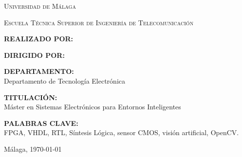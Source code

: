 \cleardoublepage

\begin{titlepage}
    \begin{center}
        {\large\scshape Universidad de Málaga \par}
        \vspace{0.2cm}
        {\normalsize\scshape Escuela Técnica Superior de Ingeniería de Telecomunicación \par}        
        \vspace{1.5cm}
        
        {\Large\bfseries \myTitle \par}
        
        \vspace{1.5cm}
    \end{center}
    
    \noindent\textbf{REALIZADO POR:}\\
    \myName
    
    \vspace{0.8cm}
    
    \noindent\textbf{DIRIGIDO POR:}\\
    \mySupervisor
    
    \vspace{0.8cm}
    
    \noindent\textbf{DEPARTAMENTO:}\\
    Departamento de Tecnolog{\'i}a Electr{\'o}nica
    
    \vspace{0.8cm}
    
    \noindent\textbf{TITULACI{\'O}N:}\\
    M{\'a}ster en Sistemas Electr{\'o}nicos para Entornos Inteligentes
    
    \vspace{0.8cm}
    
    \noindent\textbf{PALABRAS CLAVE:}\\
    FPGA, VHDL, RTL, Síntesis Lógica, sensor CMOS, visión artificial, OpenCV.
    
    \vspace{0.8cm}
    
    
    \vfill
    
    \begin{flushright}
        M{\'a}laga, \today
    \end{flushright}
\end{titlepage}